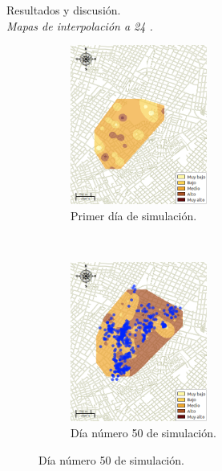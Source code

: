 \begin{frame}[t]{Resultados y discusión.\\\textit{Mapas de interpolación a 24 \textcelsius.}}
    \begin{figure}
    \begin{subfigure}[b]{0.45\textwidth}
        \includegraphics[width=4.5cm]{../book/capitulo-6/graphics/raster/temp-24-0.png}
        \caption{ Primer día de simulación.}
    \end{subfigure}
    ~~~~
    \begin{subfigure}[b]{0.45\textwidth}
        \includegraphics[width=4.5cm]{../book/capitulo-6/graphics/raster/temp-24-49.png}
        \caption{Día número 50 de simulación.}
    \end{subfigure}
    \end{figure}
\end{frame}

